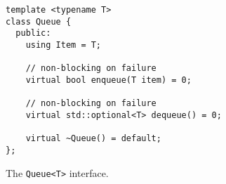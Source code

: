 \begin{listing}
\begin{verbatim}
template <typename T>
class Queue {
  public:
    using Item = T;

    // non-blocking on failure
    virtual bool enqueue(T item) = 0;

    // non-blocking on failure
    virtual std::optional<T> dequeue() = 0;

    virtual ~Queue() = default;
};
\end{verbatim}
\caption{The \texttt{Queue<T>} interface.}
\label{fig:queue-interface}
\end{listing}
